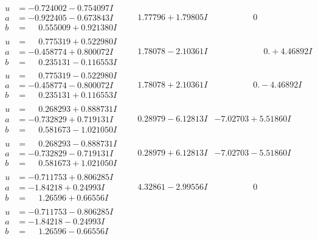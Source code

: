 \documentclass[1p]{elsarticle_modified}
\theoremstyle{definition}
\begin{document}
$$\begin{array}{c|c|c}
\begin{aligned}
u &= -0.724002 - 0.754097 I \\
a &= -0.922405 - 0.673843 I \\
b &= \phantom{-}0.555009 + 0.921380 I\end{aligned}
 & \phantom{-}1.77796 + 1.79805 I & \phantom{-0.000000 } 0 \\ \hline\begin{aligned}
u &= \phantom{-}0.775319 + 0.522980 I \\
a &= -0.458774 + 0.800072 I \\
b &= \phantom{-}0.235131 - 0.116553 I\end{aligned}
 & \phantom{-}1.78078 - 2.10361 I & \phantom{-0.000000 -}0. + 4.46892 I \\ \hline\begin{aligned}
u &= \phantom{-}0.775319 - 0.522980 I \\
a &= -0.458774 - 0.800072 I \\
b &= \phantom{-}0.235131 + 0.116553 I\end{aligned}
 & \phantom{-}1.78078 + 2.10361 I & \phantom{-0.000000 } 0. - 4.46892 I \\ \hline\begin{aligned}
u &= \phantom{-}0.268293 + 0.888731 I \\
a &= -0.732829 + 0.719131 I \\
b &= \phantom{-}0.581673 - 1.021050 I\end{aligned}
 & \phantom{-}0.28979 - 6.12813 I & -7.02703 + 5.51860 I \\ \hline\begin{aligned}
u &= \phantom{-}0.268293 - 0.888731 I \\
a &= -0.732829 - 0.719131 I \\
b &= \phantom{-}0.581673 + 1.021050 I\end{aligned}
 & \phantom{-}0.28979 + 6.12813 I & -7.02703 - 5.51860 I \\ \hline\begin{aligned}
u &= -0.711753 + 0.806285 I \\
a &= -1.84218 + 0.24993 I \\
b &= \phantom{-}1.26596 + 0.66556 I\end{aligned}
 & \phantom{-}4.32861 - 2.99556 I & \phantom{-0.000000 } 0 \\ \hline\begin{aligned}
u &= -0.711753 - 0.806285 I \\
a &= -1.84218 - 0.24993 I \\
b &= \phantom{-}1.26596 - 0.66556 I\end{aligned}

\end{array}$$
\end{document}
